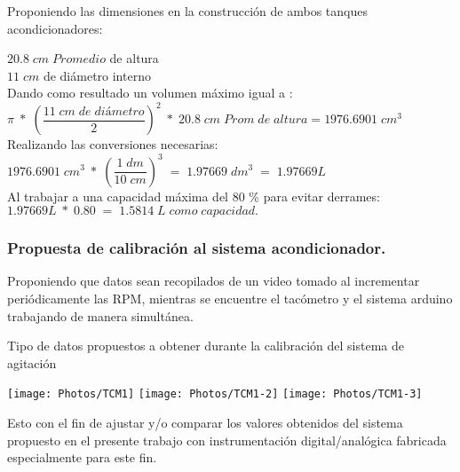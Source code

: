 \documentclass[11pt,letter
								]
								{article}
\begin{document}
	Proponiendo las dimensiones  en la construcción de ambos tanques acondicionadores: \\

		\begin{center}
		$20.8 \;cm \;Promedio  $ de altura  \\[1cm]

	$11\; cm $ de diámetro interno \\[1cm]

		Dando como resultado un volumen máximo igual a :\\[1cm]

		$\pi\; *\; (\dfrac{11 \;cm \; de\; diámetro }{2})^{2} \;*\; 20.8 \;cm \;Prom \;  de\; altura = 1976.6901\; cm ^{3}$\\[1cm]

		Realizando las conversiones necesarias:\\[1cm]

$1976.6901\; cm ^{3} \; *\;( \dfrac{1 \;dm}{10 \;cm}  )^{3} \;= \;1.97669 \;dm ^{3}\; =\; 1.97669 L $\\[1cm]

Al trabajar a una capacidad máxima del 80 \% para evitar derrames:\\[1cm]

$1.97669 L\;*\; 0.80 \;= \;1.5814 \;L \;como \;capacidad. $\\[1cm]








\end{center}
\subsubsection{Propuesta de calibración al  sistema acondicionador.}




Proponiendo que datos sean  recopilados de un video tomado al incrementar periódicamente las RPM, mientras se encuentre  el tacómetro y el sistema arduino trabajando de manera simultánea.

\begin{table}[H]
\centering
\caption{Tipo de datos propuestos a obtener  durante la  calibración   del sistema de agitación  }
\texttt{[image: Photos/TCM1]}
\texttt{[image: Photos/TCM1-2]}
\texttt{[image: Photos/TCM1-3]}

\end{table}


%
%
Esto con el fin de   ajustar y/o comparar  los valores obtenidos  del sistema propuesto en el presente trabajo con instrumentación digital/analógica fabricada especialmente  para este fin. \\
	
\end{document}
